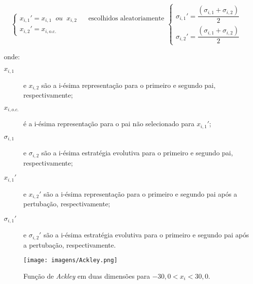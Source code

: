 \begin{subequations}
\begin{equation}\label{eq:rec_discreta}
\left\{\begin{array}{l}
x_{i,1}' = x_{i,1} \;\; \textit{ou} \;\; x_{i,2} \;\;\;\;\;\; \text{escolhidos
aleatoriamente}\\
x_{i,2}' = x_{i,\text{o.c.}}
\end{array}\right.
\end{equation}
\begin{equation}\label{eq:rec_intermediaria}
\left\{\begin{array}{l}
\sigma_{i,1}' = \dfrac{(\sigma_{i,1}+\sigma_{i,2})}{2} \\
\sigma_{i,2}' = \dfrac{(\sigma_{i,1}+\sigma_{i,2})}{2}
\end{array}\right.
\end{equation}
\end{subequations}

\noindent onde:

\begin{description}
\item[$x_{i,1}$] e $x_{i,2}$ são a i-ésima representação para o
primeiro e segundo pai, respectivamente;
\item[$x_{i,o.c.}$] é a i-ésima representação para o pai não
selecionado para $x_{i,1}'$;
\item[$\sigma_{i,1}$] e $\sigma_{i,2}$ são a i-ésima estratégia
evolutiva para o primeiro e segundo pai, respectivamente;
\item[$x_{i,1}'$] e $x_{i,2}'$ são a i-ésima representação para o
primeiro e segundo pai após a pertubação, respectivamente;
\item[$\sigma_{i,1}'$] e $\sigma_{i,2}'$ são a i-ésima estratégia
evolutiva para o primeiro e segundo pai após a pertubação,
respectivamente.
\end{description}

\begin{figure}[h!t]
\centering
\texttt{[image: imagens/Ackley.png]}
\caption{Função de \emph{Ackley} em duas dimensões para $-30,0< x_i <
30,0$.}
\label{fig:funcao_ackley}
\end{figure}


